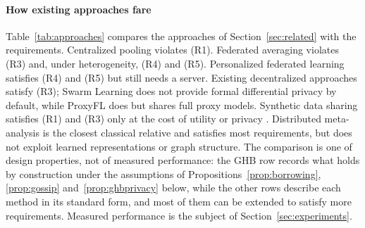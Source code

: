 \documentclass[acmsmall,screen,review]{acmart}
\theoremstyle{acmdefinition}
\begin{document}
\paragraph{How existing approaches fare} Table~\ref{tab:approaches} compares the approaches of Section~\ref{sec:related} with the requirements. Centralized pooling violates (R1). Federated averaging \cite{mcmahan2017communication} violates (R3) and, under heterogeneity, (R4) and (R5). Personalized federated learning satisfies (R4) and (R5) but still needs a server. Existing decentralized approaches satisfy (R3); Swarm Learning \cite{warnatherresthal2021swarm} does not provide formal differential privacy by default, while ProxyFL \cite{kalra2023decentralized} does but shares full proxy models. Synthetic data sharing satisfies (R1) and (R3) only at the cost of utility or privacy \cite{jordon2019pate,stadler2022synthetic}. Distributed meta-analysis is the closest classical relative and satisfies most requirements, but does not exploit learned representations or graph structure. The comparison is one of design properties, not of measured performance: the GHB row records what holds by construction under the assumptions of Propositions~\ref{prop:borrowing}, \ref{prop:gossip} and~\ref{prop:ghbprivacy} below, while the other rows describe each method in its standard form, and most of them can be extended to satisfy more requirements. Measured performance is the subject of Section~\ref{sec:experiments}.
\end{document}
